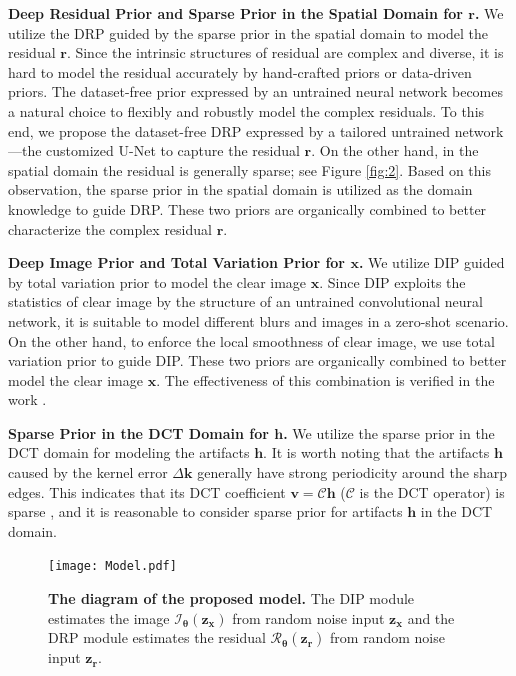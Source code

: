 \documentclass[10pt,twocolumn,letterpaper]{article}
\begin{document}
	\noindent\textbf{Deep Residual Prior and Sparse Prior in the Spatial Domain for $\bm r$.} 
	We utilize the DRP guided by the sparse prior in the spatial domain to model the residual $\bm r$.
	Since the intrinsic structures of residual are complex and diverse, it is hard to model the residual accurately by hand-crafted priors {or} data-driven priors.  The dataset-free prior expressed by an untrained neural network becomes a natural choice to flexibly and robustly model the complex  residuals. To this end, we propose the dataset-free DRP expressed by a tailored untrained  network---the customized U-Net to capture the residual $\bm r$.   On the other hand, in the spatial domain the residual is generally sparse; see Figure \ref{fig:2}.  Based on this observation, the sparse prior in the spatial domain is utilized as the domain knowledge to guide DRP. These two priors are organically combined to better characterize the complex residual $\bm r$.
	
	\noindent\textbf{Deep Image Prior and Total Variation Prior for $\bm x$.}
	We utilize DIP guided by total variation prior to model the clear image $\bm x$. Since DIP \cite{imaulyanov2018deep,ren2020neural} exploits the statistics of clear image by the structure of an untrained convolutional neural network, it is suitable to model different blurs and images in a zero-shot scenario. On the other hand, to enforce the local smoothness of clear image, we use total variation prior to guide DIP. These two priors are organically combined to better model the clear image $\bm x$. The effectiveness of this combination is verified in the work \cite{ren2020neural}.
	
	
	\noindent\textbf{Sparse Prior in the DCT Domain for $\bm h$.}
	We utilize the sparse prior in the DCT domain for modeling the artifacts $\bm h$. It is worth noting that the artifacts {$\boldsymbol{h}$} caused by the kernel error $\Delta \boldsymbol{k}$ generally have strong periodicity around the sharp edges. This indicates that its DCT coefficient $\bm v=\mathcal C\bm h$ ($\mathcal C$ is the DCT operator) is sparse \cite{ji2011robust}, and it is reasonable to consider sparse prior for artifacts $\boldsymbol{h}$ in the DCT domain.
	
	\begin{figure}[t]
		\centering
		\texttt{[image: Model.pdf]}
		\caption{\textbf{The diagram of the proposed model.} The DIP module estimates the image $\mathcal I_{\bm\theta}(\bm{z_x})$ from random noise input $\bm{z_x}$ and the DRP  module estimates the residual $\mathcal R_{\bm\theta}(\bm{z_r})$ from random noise input $\bm {z_r}$.}
		\label{fig3}
	\end{figure} 
	
\end{document}
